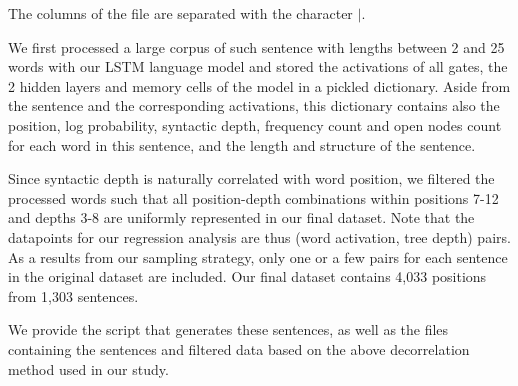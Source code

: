 \documentclass{article}
\begin{document}
\noindent The columns of the file are separated with the character $|$.

We first processed a large corpus of such sentence with lengths between 2 and 25 words with our LSTM language model and stored the activations of all gates, the 2 hidden layers and memory cells of the model in a pickled dictionary.
Aside from the sentence and the corresponding activations, this dictionary contains also the position, log probability, syntactic depth, frequency count and open nodes count for each word in this sentence, and the length and structure of the sentence.

Since syntactic depth is naturally correlated with word position, we filtered the processed words such that all position-depth combinations within positions 7-12 and depths 3-8 are uniformly represented in our final dataset.
Note that the datapoints for our regression analysis are thus (word activation, tree depth) pairs. As a results from our sampling strategy, only one or a few pairs for each sentence in the original dataset are included.
Our final dataset contains 4,033 positions from 1,303 sentences.

We provide the script that generates these sentences, as well as the files containing the sentences and filtered data based on the above decorrelation method used in our study.
\end{document}
